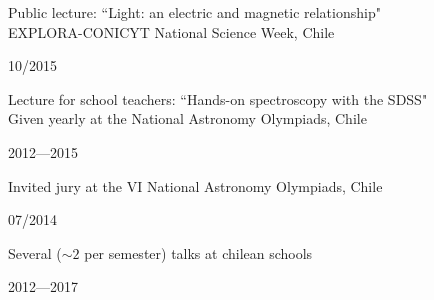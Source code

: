 \documentclass[11pt, a4paper]{article} %
\begin{document}
\vspace{0.3 cm}

\begin{minipage}[t]{0.7\textwidth}
\begin{flushleft}%
  \setlength{\leftskip}{0.2cm}%
Public lecture: ``Light: an electric and magnetic relationship"\\
EXPLORA-CONICYT National Science Week, Chile
\end{flushleft}
\end{minipage}
\begin{minipage}[t]{0.3\textwidth}
\hfill 10/2015
\end{minipage}

\vspace{0.3 cm}

\begin{minipage}[t]{0.7\textwidth}
\begin{flushleft}%
  \setlength{\leftskip}{0.2cm}%
Lecture for school teachers: ``Hands-on spectroscopy with the SDSS"\\
Given yearly at the National Astronomy Olympiads, Chile  
\end{flushleft}
\end{minipage}
\begin{minipage}[t]{0.3\textwidth}
\hfill 2012---2015
\end{minipage}

\vspace{0.3 cm}

\begin{minipage}[t]{0.7\textwidth}
\begin{flushleft}%
  \setlength{\leftskip}{0.2cm}%
Invited jury at the VI National Astronomy Olympiads, Chile  
\end{flushleft}
\end{minipage}
\begin{minipage}[t]{0.3\textwidth}
\hfill 07/2014
\end{minipage}

\vspace{0.3 cm}

\begin{minipage}[t]{0.7\textwidth}
\begin{flushleft}%
  \setlength{\leftskip}{0.2cm}%
Several ($\sim 2$ per semester) talks at chilean schools 
\end{flushleft}
\end{minipage}
\begin{minipage}[t]{0.3\textwidth}
\hfill 2012---2017
\end{minipage}
\end{document}
